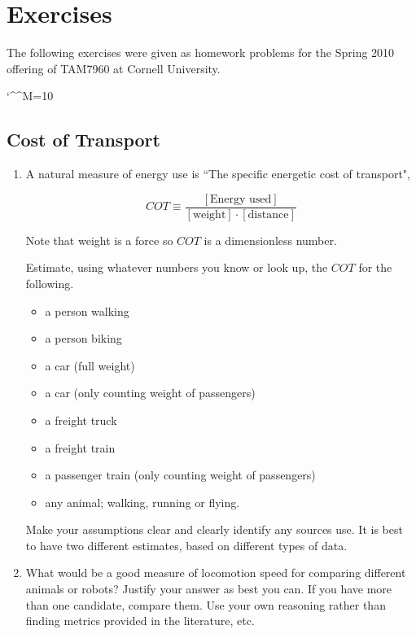 \chapter{Exercises} %
\label{sec:Exercises}

The following exercises were given as homework problems for the Spring 2010 offering of TAM7960 at Cornell University.

\catcode`\^^M=10      %

\section{Cost of Transport}

\begin{enumerate}
\item A natural measure of energy use is ``The specific energetic
cost of transport",

\begin{equation}                  
COT \equiv \frac{[\textrm{Energy used}]}{[\textrm{weight}]\cdot[\textrm{distance}]}
\end{equation}

Note that weight is a force so $COT$ is a
dimensionless number.

Estimate, using whatever numbers you know or look up, the
$COT$ for the following.

\begin{itemize}
\item  a person walking
\item a person biking
\item a car (full weight)
\item a car (only counting weight of passengers)
\item a freight truck
\item a freight train
\item a passenger train (only counting weight of passengers)
\item any animal; walking, running or flying.
\end{itemize}

Make your assumptions clear and clearly identify any sources use.  It is best to have two
different estimates, based on different types of data.

\item What would be a good measure of locomotion speed for 
comparing different animals or robots?  Justify your answer
as best you can.  If you have more than one candidate, 
compare them. Use your own reasoning rather than finding metrics provided in the literature, etc.
\end{enumerate}


